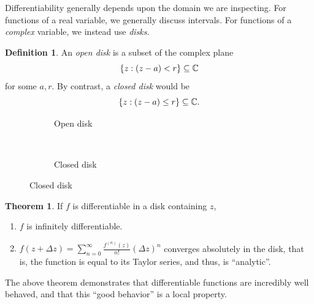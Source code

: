 \documentclass[10pt]{scrartcl}
\numberwithin{equation}{subsection}
\theoremstyle{definition}
\newtheorem{definition}{Definition}[section]
\newtheorem{theorem}{Theorem}[section]
\theoremstyle{remark}
\newenvironment{definitionSR}
	{
		\begin{siderules}
			\begin{definition}
			}
			{
			\end{definition}
		\end{siderules}
	}
\newenvironment{theoremSR}
	{
		\begin{siderules}
			\begin{theorem}
			}
			{
			\end{theorem}
		\end{siderules}
	}
\newcommand{\Complex}{\mathbb{C}}
\begin{document}
Differentiability generally depends upon the domain we are inspecting.
For functions of a real variable, we generally discuss intervals.
For functions of a \emph{complex} variable, we instead use \textit{disks}.
\begin{definitionSR}
An \textit{open disk} is a subset of the complex plane
\[
\Bqty{z: (z-a)<r} \subseteq \Complex
\]
for some $a,r$. By contrast, a \textit{closed disk} would be
\[
\Bqty{z: (z-a)\leq r} \subseteq \Complex.
\]
\end{definitionSR}
\begin{figure}[h]
\centering
\begin{subfigure}[b]{.4\textwidth}
\caption{Open disk}
\end{subfigure}
~~
\begin{subfigure}[b]{.4\textwidth}
\caption{Closed disk}
\end{subfigure}
\end{figure}

\begin{theoremSR}
If $f$ is differentiable in a disk containing $z$,
\begin{enumerate}
\item $f$ is infinitely differentiable.
\item $f(z+\Delta z) = \sum_{n=0}^\infty \frac{f^{(n)}(z)}{n!} (\Delta z)^n$
converges absolutely in the disk, that is, the function is equal to its Taylor
series, and thus, is ``analytic''.
\end{enumerate}
\end{theoremSR}
The above theorem demonstrates that differentiable functions are incredibly
well behaved, and that this ``good behavior'' is a local property.
\end{document}
